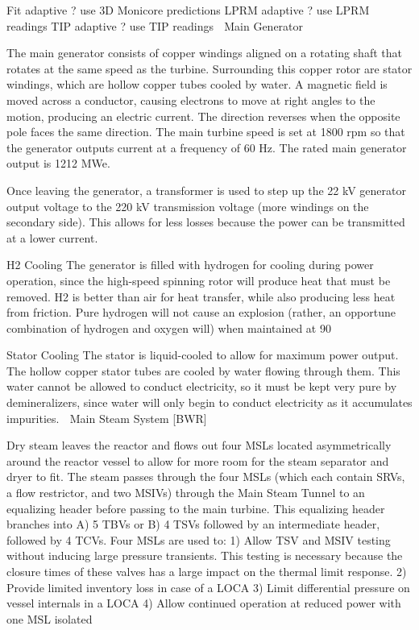 \documentclass[10pt]{article}
\begin{document}
Fit adaptive ? use 3D Monicore predictions
LPRM adaptive ? use LPRM readings
TIP adaptive ? use TIP readings

Main Generator

The main generator consists of copper windings aligned on a rotating shaft that rotates at the same speed as the turbine. Surrounding this copper rotor are stator windings, which are hollow copper tubes cooled by water. A magnetic field is moved across a conductor, causing electrons to move at right angles to the motion, producing an electric current. The direction reverses when the opposite pole faces the same direction. The main turbine speed is set at 1800 rpm so that the generator outputs current at a frequency of 60 Hz. The rated main generator output is 1212 MWe. 

Once leaving the generator, a transformer is used to step up the 22 kV generator output voltage to the 220 kV transmission voltage (more windings on the secondary side). This allows for less losses because the power can be transmitted at a lower current. 

H2 Cooling
The generator is filled with hydrogen for cooling during power operation, since the high-speed spinning rotor will produce heat that must be removed. H2 is better than air for heat transfer, while also producing less heat from friction. Pure hydrogen will not cause an explosion (rather, an opportune combination of hydrogen and oxygen will) when maintained at 90%

Stator Cooling
The stator is liquid-cooled to allow for maximum power output. The hollow copper stator tubes are cooled by water flowing through them. This water cannot be allowed to conduct electricity, so it must be kept very pure by demineralizers, since water will only begin to conduct electricity as it accumulates impurities. 
Main Steam System [BWR]

Dry steam leaves the reactor and flows out four MSLs located asymmetrically around the reactor vessel to allow for more room for the steam separator and dryer to fit. The steam passes through the four MSLs (which each contain SRVs, a flow restrictor, and two MSIVs) through the Main Steam Tunnel to an equalizing header before passing to the main turbine. This equalizing header branches into A) 5 TBVs or B) 4 TSVs followed by an intermediate header, followed by 4 TCVs. Four MSLs are used to:
1)	Allow TSV and MSIV testing without inducing large pressure transients. This testing is necessary because the closure times of these valves has a large impact on the thermal limit response. 
2)	Provide limited inventory loss in case of a LOCA
3)	Limit differential pressure on vessel internals in a LOCA
4)	Allow continued operation at reduced power with one MSL isolated
\end{document}
